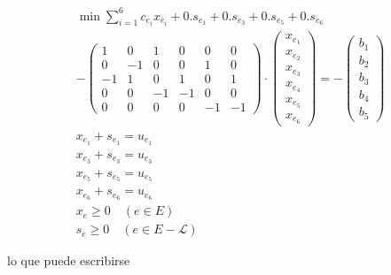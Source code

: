 \documentclass[10pt]{article}
\begin{document}
$$
\begin{gathered}
\min \sum_{i=1}^{6} c_{e_{i}} x_{e_{i}}+0 . s_{e_{1}}+0 . s_{e_{3}}+0 . s_{e_{5}}+0 . s_{e_{6}} \\
-\left(\begin{array}{cccccc}
1 & 0 & 1 & 0 & 0 & 0 \\
0 & -1 & 0 & 0 & 1 & 0 \\
-1 & 1 & 0 & 1 & 0 & 1 \\
0 & 0 & -1 & -1 & 0 & 0 \\
0 & 0 & 0 & 0 & -1 & -1
\end{array}\right) \cdot\left(\begin{array}{l}
x_{e_{1}} \\
x_{e_{2}} \\
x_{e_{3}} \\
x_{e_{4}} \\
x_{e_{5}} \\
x_{e_{6}}
\end{array}\right)=-\left(\begin{array}{l}
b_{1} \\
b_{2} \\
b_{3} \\
b_{4} \\
b_{5}
\end{array}\right) \\
x_{e_{1}}+s_{e_{1}}=u_{e_{1}} \\
x_{e_{3}}+s_{e_{3}}=u_{e_{3}} \\
x_{e_{5}}+s_{e_{5}}=u_{e_{5}} \\
x_{e_{6}}+s_{e_{6}}=u_{e_{6}} \\
x_{e} \geq 0 \quad(e \in E) \\
s_{e} \geq 0 \quad(e \in E-\mathcal{L})
\end{gathered}
$$

lo que puede escribirse
\end{document}
